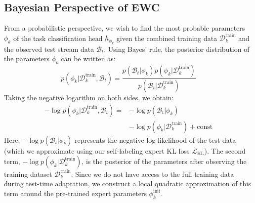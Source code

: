 \documentclass{article}
\theoremstyle{plain}
\theoremstyle{definition}
\theoremstyle{remark}
\begin{document}
\subsection{Bayesian Perspective of EWC}
From a probabilistic perspective, we wish to find the most probable parameters $\phi_k$ of the task classification head $h_{\phi_k}$ given the combined training data $\mathcal{D}_k^{\text{train}}$ and the observed test stream data $\mathcal{B}_t$. Using Bayes' rule, the posterior distribution of the parameters $\phi_k$ can be written as:
\begin{equation}
    p(\phi_k | \mathcal{D}_k^{\text{train}}, \mathcal{B}_t) = \frac{p(\mathcal{B}_t | \phi_k) p(\phi_k | \mathcal{D}_k^{\text{train}})}{p(\mathcal{B}_t | \mathcal{D}_k^{\text{train}})}
\end{equation}
Taking the negative logarithm on both sides, we obtain:
\begin{align}
    -\log p(\phi_k | \mathcal{D}_k^{\text{train}}, \mathcal{B}_t) = &-\log p(\mathcal{B}_t | \phi_k) \nonumber \\
    &-\log p(\phi_k | \mathcal{D}_k^{\text{train}}) + \text{const}
\end{align}
Here, $-\log p(\mathcal{B}_t | \phi_k)$ represents the negative log-likelihood of the test data (which we approximate using our self-labeling expert KL loss $\mathcal{L}_{\text{KL}}$). The second term, $-\log p(\phi_k | \mathcal{D}_k^{\text{train}})$, is the posterior of the parameters after observing the training dataset $\mathcal{D}_k^{\text{train}}$. Since we do not have access to the full training data during test-time adaptation, we construct a local quadratic approximation of this term around the pre-trained expert parameters $\phi_k^{\text{init}}$.
\end{document}
